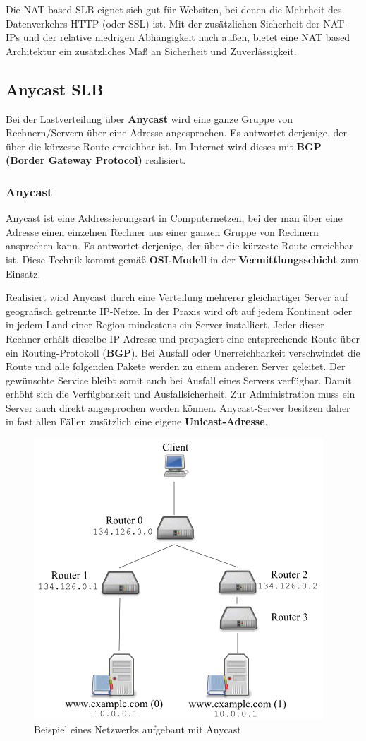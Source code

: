 Die NAT based SLB eignet sich gut für Websiten, bei denen die Mehrheit des Datenverkehrs HTTP (oder SSL) ist. Mit der zusätzlichen Sicherheit der NAT-IPs und der relative niedrigen Abhängigkeit nach außen, bietet eine NAT based Architektur ein zusätzliches Maß an Sicherheit und Zuverlässigkeit.
\newpage


\subsection{Anycast SLB}\cite{AS}
Bei der Lastverteilung über \textbf{Anycast} wird eine ganze Gruppe von Rechnern/Servern über eine Adresse angesprochen. Es antwortet derjenige, der über die kürzeste Route erreichbar ist. Im Internet wird dieses mit \textbf{BGP (Border Gateway Protocol)} realisiert.

\subsubsection{Anycast}\cite{anycast}
Anycast ist eine Addressierungsart in Computernetzen, bei der man über eine Adresse einen einzelnen Rechner aus einer ganzen Gruppe von Rechnern ansprechen kann. Es antwortet derjenige, der über die kürzeste Route erreichbar ist. Diese Technik kommt gemäß \textbf{OSI-Modell} in der \textbf{Vermittlungsschicht} zum Einsatz.

Realisiert wird Anycast durch eine Verteilung mehrerer gleichartiger Server auf geografisch getrennte IP-Netze. In der Praxis wird oft auf jedem Kontinent oder in jedem Land einer Region mindestens ein Server installiert. Jeder dieser Rechner erhält dieselbe IP-Adresse und propagiert eine entsprechende Route über ein Routing-Protokoll (\textbf{BGP}). Bei Ausfall oder Unerreichbarkeit verschwindet die Route und alle folgenden Pakete werden zu einem anderen Server geleitet. Der gewünschte Service bleibt somit auch bei Ausfall eines Servers verfügbar. Damit erhöht sich die Verfügbarkeit und Ausfallsicherheit. Zur Administration muss ein Server auch direkt angesprochen werden können. Anycast-Server besitzen daher in fast allen Fällen zusätzlich eine eigene \textbf{Unicast-Adresse}.

\begin{figure}[!h]
	\begin{center}
		\includegraphics[width=0.5\linewidth]{images/anycast_slb}
		\caption{Beispiel eines Netzwerks aufgebaut mit Anycast}
		\label{anycast_slb_01}
	\end{center}
\end{figure}
